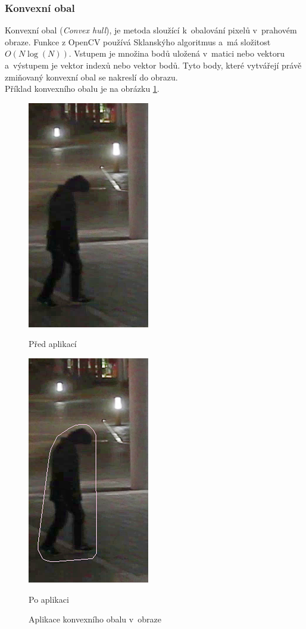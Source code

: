 \subsubsection*{Konvexní obal}
Konvexní obal (\textit{Convex hull}), je metoda sloužící k~obalování pixelů v~prahovém obraze. Funkce z OpenCV používá Sklanskýho algoritmus \cite{openCV:sklansky} a~má složitost  $O(N \log(N))$. Vstupem je množina bodů uložená v~matici nebo vektoru a~výstupem je vektor indexů nebo vektor bodů. Tyto body, které vytvářejí právě zmiňovaný konvexní obal se nakreslí do obrazu. \\
Příklad konvexního obalu je na obrázku \ref{fig:convexHull}.
\begin{figure}[H]
\centering
\begin{minipage}{.5\textwidth}
  \centering
  \includegraphics[width=.3\linewidth]{figures/Hull_Original}
  \caption*{Před aplikací}
  \label{fig:original}
\end{minipage}%
\begin{minipage}{.5\textwidth}
  \centering
  \includegraphics[width=.3\linewidth]{figures/Hull_Result}
  \caption*{Po aplikaci}
  \label{fig:result}
\end{minipage}
\caption{Aplikace konvexního obalu v~obraze}
\label{fig:convexHull}
\end{figure} 

